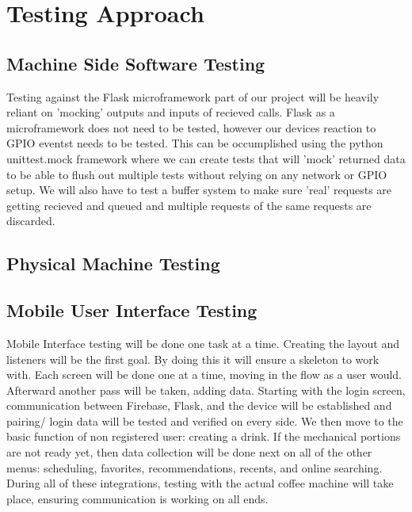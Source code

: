 \documentclass[conference]{IEEEtran}
\begin{document}

\section{Testing Approach}

\subsection{Machine Side Software Testing}
Testing against the Flask microframework part of our project will be heavily reliant on 'mocking'
outputs and inputs of recieved calls. Flask as a microframework does not need to be tested, however
our devices reaction to GPIO eventst needs to be tested. This can be occumplished using the python
unittest.mock framework  \cite{mock} where we can create tests that will 'mock' returned data to
be able to flush out multiple tests without relying on any network or GPIO setup. We will also have to 
test a buffer system to make sure 'real' requests are getting recieved and queued and multiple requests
of the same requests are discarded.

\subsection{Physical Machine Testing}

\subsection{Mobile User Interface Testing}
Mobile Interface testing will be done one task at a time. Creating the layout and listeners will be the first
 goal. By doing this it will ensure a skeleton to work with. Each screen will be done one at a time,
moving in the flow as a user would. Afterward another pass will be taken, adding data. Starting with the
 login screen, communication between Firebase, Flask, and the device will be established and pairing/
 login data will be tested and verified on every side. We then move to the basic function of non
  registered user: creating a drink. If the mechanical portions are not ready yet, then data collection will
   be done next on all of the other menus: scheduling, favorites, recommendations, recents, and online
    searching. During all of these integrations, testing with the actual coffee machine will take place, 
    ensuring communication is working on all ends. 
\end{document}

